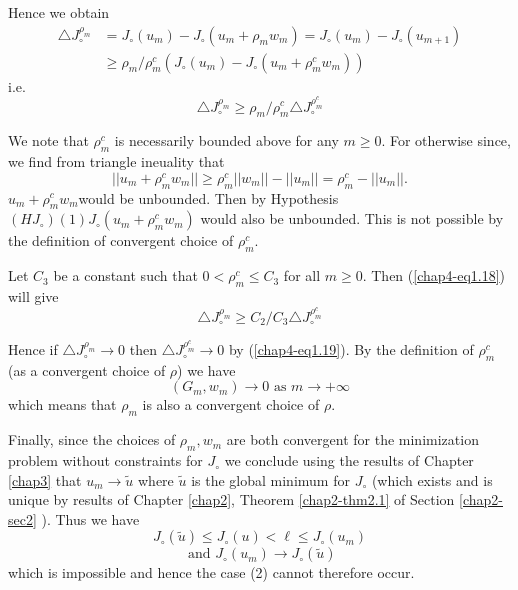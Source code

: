 Hence we obtain
\begin{align*}
\triangle J_{\circ}^{\rho_{m}} & = J_{\circ} (u_{m}) - J_{\circ}(u_{m} + \rho_{m} w_{m}) = J_{\circ}(u_{m}) - J_{\circ} (u_{m+1})\\
& \geq \rho_{m}/\rho_{m}^{c} (J_{\circ} (u_{m}) - J_{\circ}(u_{m} + \rho_{m}^c w_{m}))
\end{align*}
i.e. 
\begin{equation*}
\triangle J_{\circ}^{\rho_{m}} \geq \rho_{m} / \rho_{m}^{c} \triangle J_{\circ}^{\rho_{m}^{c}}\tag{1.18}\label{chap4-eq1.18}
\end{equation*}

We note that $\rho_{m}^{c}$ is necessarily bounded above for any $m \geq 0$. For otherwise since, we find from triangle ineuality that
$$
||u_{m} + \rho_{m}^{c} w_{m}|| \geq \rho_{m}^{c} ||w_{m}|| - ||u_{m}|| = \rho_{m}^{c} - ||u_{m}||.
$$
$u_{m} + \rho_{m}^{c} w_{m}$\pageoriginale would be unbounded. Then by Hypothesis $(HJ_{\circ}) (1) J_{\circ} (u_{m} + \rho_{m}^{c} w_{m})$ would also be unbounded. This is not possible by the definition of convergent choice of $\rho_{m}^{c}$.

Let $C_{3}$ be a constant such that $0 < \rho_{m}^{c} \leq C_{3}$ for all $m \geq 0$. Then (\ref{chap4-eq1.18}) will give
\begin{equation*}
\triangle J_{\circ}^{\rho_{m}} \geq C_{2} / C_{3} \triangle J_{\circ}^{\rho_{m}^{c}}\tag{1.19}\label{chap4-eq1.19} 
\end{equation*}

Hence if $\triangle J_{\circ}^{\rho_{m}} \to 0$ then $\triangle
J_{\circ}^{\rho_{m}^{c}} \to 0$ by (\ref{chap4-eq1.19}). By the
definition of $\rho_{m}^{c}$ (as a convergent choice of $\rho$) we
have 
$$
(G_{m}, w_{m}) \to 0 \text{ as } m \to + \infty
$$
which means that $\rho_{m}$ is also a convergent choice of $\rho$.

Finally, since the choices of $\rho_{m}, w_{m}$ are both convergent for the minimization problem without constraints for $J_{\circ}$ we conclude using the results of Chapter \ref{chap3} that $u_{m} \to \widetilde{u}$ where $\widetilde{u}$ is the global minimum for $J_{\circ}$ (which exists and is unique by results of Chapter \ref{chap2}, Theorem \ref{chap2-thm2.1} of Section \ref{chap2-sec2} ). Thus we have
$$
J_{\circ} (\widetilde{u}) \leq J_{\circ} (u) < \ell \leq J_{\circ} (u_{m})
$$
$$
\text{ and } J_{\circ} (u_{m}) \to J_{\circ} (\widetilde{u})
$$
which is impossible and hence the case (2) cannot therefore occur.

